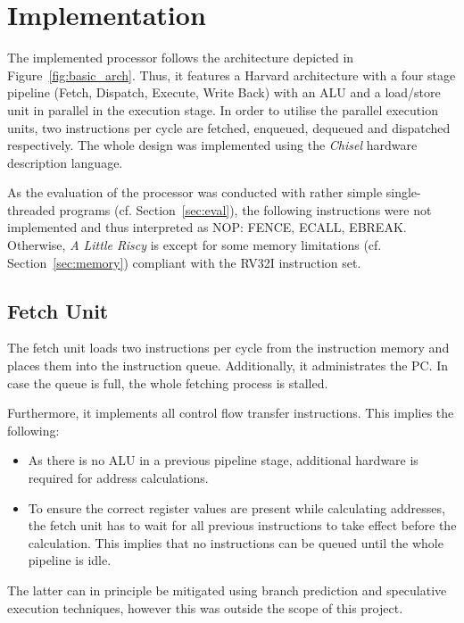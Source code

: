 \documentclass[conference]{IEEEtran}
\begin{document}
\section{Implementation} \label{sec:implementation}
The implemented processor follows the architecture depicted in Figure~\ref{fig:basic_arch}. Thus, it features a Harvard architecture with a four stage pipeline (Fetch, Dispatch, Execute, Write Back) with an ALU and a load/store unit in parallel in the execution stage. In order to utilise the parallel execution units, two instructions per cycle are fetched, enqueued, dequeued and dispatched respectively. The whole design was implemented using the \emph{Chisel} hardware description language.

As the evaluation of the processor was conducted with rather simple single-threaded programs (cf. Section~\ref{sec:eval}), the following instructions were not implemented and thus interpreted as NOP: FENCE, ECALL, EBREAK. Otherwise, \emph{A Little Riscy} is except for some memory limitations (cf. Section~\ref{sec:memory}) compliant with the RV32I instruction set.

\subsection{Fetch Unit}
The fetch unit loads two instructions per cycle from the instruction memory and places them into the instruction queue. Additionally, it administrates the PC. In case the queue is full, the whole fetching process is stalled.

Furthermore, it implements all control flow transfer instructions. This implies the following:
\begin{itemize}
	\item As there is no ALU in a previous pipeline stage, additional hardware is required for address calculations.
	\item To ensure the correct register values are present while calculating addresses, the fetch unit has to wait for all previous instructions to take effect before the calculation. This implies that no instructions can be queued until the whole pipeline is idle.
\end{itemize}

The latter can in principle be mitigated using branch prediction and speculative execution techniques, however this was outside the scope of this project.
\end{document}
